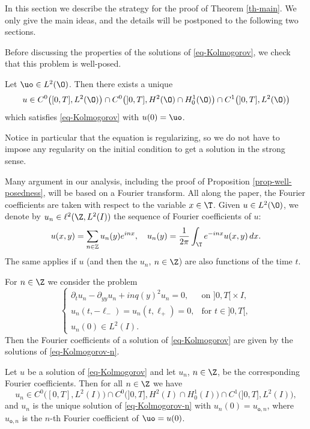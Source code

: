 In this section we describe the strategy for the proof of Theorem \ref{th-main}. We only give the main ideas, and the details will be postponed to the following two sections.


Before discussing the properties of the solutions of \eqref{eq-Kolmogorov}, we check that this problem is well-posed.

\begin{proposition} \label{prop-well-posedness}
Let $\uo \in L^2(\O)$. Then there exists a unique
\[
u \in C^0 \bigl([0,T],L^2(\O) \bigr) \cap C^0 \bigl(]0,T],H^2(\O) \cap H^1_0(\O) \bigr) \cap C^1 \bigl(]0,T], L^2(\O) \bigr)
\]
which satisfies \eqref{eq-Kolmogorov} with $u(0) = \uo$.
\end{proposition}

Notice in particular that the equation is regularizing, so we do not have to impose any regularity on the initial condition to get a solution in the strong sense.

Many argument in our analysis, including the proof of Proposition \ref{prop-well-posedness}, will be based on a Fourier transform. All along the paper, the Fourier coefficients are taken with respect to the variable $x \in \T$. Given $u \in L^2(\O)$, we denote by $u_n \in \ell^2(\Z,L^2(I))$ the sequence of Fourier coefficients of $u$:
\[
u(x,y) = \sum_{n\in \mathbb{Z}} u_n(y) e^{i n x}, \quad u_n (y) = \frac 1 {2\pi} \int_\T e^{-inx} u(x,y) \, dx.
\]
The same applies if $u$ (and then the $u_n$, $n \in \Z$) are also functions of the time $t$.

For $n \in \Z$ we consider the problem
\begin{equation} \label{eq-Kolmogorov-n}
\begin{cases}
\partial_t u_n - \partial_{yy} u_n + inq(y)^2 u_n = 0, & \text{on } ]0,T[{}\times I,\\
u_n(t,-\ell_-) = u_n(t,\ell_+) = 0, & \text{for } t \in{}]0,T[,\\
u_n(0) \in L^2(I).
\end{cases}
\end{equation}
Then the Fourier coefficients of a solution of \eqref{eq-Kolmogorov} are given by the solutions of \eqref{eq-Kolmogorov-n}.

\begin{proposition} \label{prop-well-posedness-n}
Let $u$ be a solution of \eqref{eq-Kolmogorov} and let $u_n$, $n \in \Z$, be the corresponding Fourier coefficients. Then for all $n \in \Z$ we have
\[
u_n \in C^0 \bigl([0,T],L^2(I) \bigr) \cap C^0 \bigl(]0,T],H^2(I) \cap H^1_0(I) \bigr) \cap C^1 \bigl(]0,T], L^2(I) \bigr),
\]
and $u_n$ is the unique solution of \eqref{eq-Kolmogorov-n} with $u_n(0) = u_{\mathsf{o},n}$, where $u_{\mathsf{o},n}$ is the $n$-th Fourier coefficient of $\uo = u(0)$.
\end{proposition}

